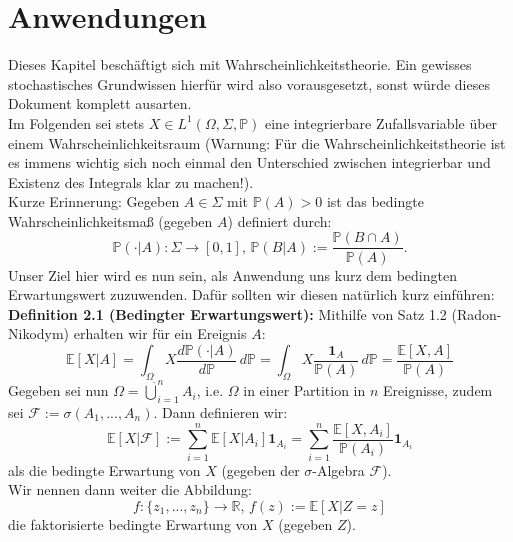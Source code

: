 \documentclass[11pt,english]{smfart}
\begin{document}
\section{Anwendungen}
Dieses Kapitel beschäftigt sich mit Wahrscheinlichkeitstheorie. Ein gewisses stochastisches Grundwissen hierfür wird also vorausgesetzt, sonst würde dieses Dokument komplett ausarten.\\
Im Folgenden sei stets \(X \in L^1(\Omega,\Sigma,\mathbb{P})\) eine integrierbare Zufallsvariable über einem Wahrscheinlichkeitsraum (Warnung: Für die Wahrscheinlichkeitstheorie ist es immens wichtig sich noch einmal den Unterschied zwischen integrierbar und Existenz des Integrals klar zu machen!).\\
Kurze Erinnerung: Gegeben \(A \in \Sigma\) mit \(\mathbb{P}(A) > 0\) ist das bedingte Wahrscheinlichkeitsmaß (gegeben \(A\)) definiert durch:
\begin{equation}
    \mathbb{P}(\cdot | A) : \Sigma \to [0,1], \, \mathbb{P}(B | A) := \frac{\mathbb{P}(B \cap A)}{\mathbb{P}(A)}.
\end{equation}
Unser Ziel hier wird es nun sein, als Anwendung uns kurz dem bedingten Erwartungswert zuzuwenden. Dafür sollten wir diesen natürlich kurz einführen:\\
\textbf{Definition 2.1 (Bedingter Erwartungswert):} Mithilfe von Satz 1.2 (Radon-Nikodym) erhalten wir für ein Ereignis \(A\):
\begin{equation}
    \mathbb{E}[X | A] = \int_{\Omega} X \frac{d\mathbb{P}(\cdot | A)}{d\mathbb{P}} \,d\mathbb{P} = \int_{\Omega} X \frac{\textbf{1}_A}{\mathbb{P}(A)} \,d\mathbb{P} = \frac{\mathbb{E}[X,A]}{\mathbb{P}(A)}
\end{equation}
Gegeben sei nun \(\Omega = \dot{\bigcup}_{i=1}^n A_i\), i.e. \(\Omega\) in einer Partition in \(n\) Ereignisse, zudem sei \(\mathcal{F} := \sigma (A_1,...,A_n)\). Dann definieren wir:
\begin{equation}
    \mathbb{E}[X | \mathcal{F}] := \sum_{i=1}^n \mathbb{E}[X | A_i] \textbf{1}_{A_i} = \sum_{i=1}^n \frac{\mathbb{E}[X,A_i]}{\mathbb{P}(A_i)} \textbf{1}_{A_i}
\end{equation}
als die bedingte Erwartung von \(X\) (gegeben der \(\sigma\)-Algebra \(\mathcal{F}\)).\\
Wir nennen dann weiter die Abbildung:
\begin{equation}
    f : \{z_1,...,z_n\} \to \mathbb{R}, \, f(z) := \mathbb{E}[X | Z = z]
\end{equation}
die faktorisierte bedingte Erwartung von \(X\) (gegeben \(Z\)).\\[0.5cm]
\end{document}
